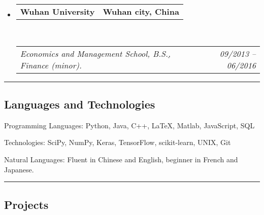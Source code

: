 \documentclass[10pt,letterpaper]{article}
\makeatletter
\newenvironment{indentsection}[1]%
{\begin{list}{}%
	{\setlength{\leftmargin}{#1}}%
	\item[]%
}
{\end{list}}
\newcommand{\headerrow}[2]
{\begin{tabular*}{\linewidth}{l@{\extracolsep{\fill}}r}
	#1 &
	#2 \\
\end{tabular*}}
\makeatother
\begin{document}
\begin{itemize}
	\item 
	\headerrow
		{\textbf{Wuhan University}}
		{\textbf{Wuhan city, China}}
	\\
	\headerrow
		{\emph{Economics and Management School, B.S.\href{https://github.com/skaudrey/cv/blob/master/certificate/certificate.pdf}, Finance (minor).}}
		{\emph{09/2013 -- 06/2016}}
	
\end{itemize}

\hrule
\vspace{-0.4em}
\subsection*{Languages and Technologies}

\begin{indentsection}{\parindent}
\begin{description*}
	\item[Programming Languages:]
	Python, Java, C++, \LaTeX, Matlab, JavaScript, SQL
	\item[Technologies:]
	SciPy, NumPy, Keras, TensorFlow, scikit-learn, UNIX, Git
	\item[Natural Languages:]
	Fluent in Chinese and English, beginner in French and Japanese.
\end{description*}
\end{indentsection}




\hrule
\vspace{-0.4em}
\subsection*{Projects}
\end{document}
